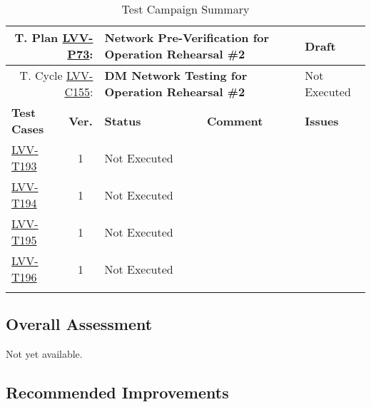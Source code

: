 \documentclass[DM,lsstdraft,STR,toc]{lsstdoc}
\begin{document}
{\small
\begin{longtable}{p{2cm}cp{2.3cm}p{8.6cm}p{2.3cm}}
\toprule
\multicolumn{2}{r}{ T. Plan \href{https://jira.lsstcorp.org/secure/Tests.jspa\#/testPlan/LVV-P73}{LVV-P73}:} &
\multicolumn{2}{p{10.9cm}}{\textbf{ Network Pre-Verification for Operation Rehearsal \#2 }} & Draft \\\hline
\multicolumn{2}{r}{ T. Cycle \href{https://jira.lsstcorp.org/secure/Tests.jspa\#/testCycle/LVV-C155}{LVV-C155}:} &
\multicolumn{2}{p{10.9cm}}{\textbf{ DM Network Testing for Operation Rehearsal \#2 }} & Not Executed \\\hline
\textbf{Test Cases} &  \textbf{Ver.} & \textbf{Status} & \textbf{Comment} & \textbf{Issues} \\\toprule
\href{https://jira.lsstcorp.org/secure/Tests.jspa#/testCase/LVV-T193}{LVV-T193}
&  1
& Not Executed &
\begin{minipage}[]{9cm}
\smallskip

\medskip
\end{minipage}
&
\\\hline
\href{https://jira.lsstcorp.org/secure/Tests.jspa#/testCase/LVV-T194}{LVV-T194}
&  1
& Not Executed &
\begin{minipage}[]{9cm}
\smallskip

\medskip
\end{minipage}
&
\\\hline
\href{https://jira.lsstcorp.org/secure/Tests.jspa#/testCase/LVV-T195}{LVV-T195}
&  1
& Not Executed &
\begin{minipage}[]{9cm}
\smallskip

\medskip
\end{minipage}
&
\\\hline
\href{https://jira.lsstcorp.org/secure/Tests.jspa#/testCase/LVV-T196}{LVV-T196}
&  1
& Not Executed &
\begin{minipage}[]{9cm}
\smallskip

\medskip
\end{minipage}
&
\\\hline
\caption{Test Campaign Summary}
\label{table:summary}
\end{longtable}
}

\subsection{Overall Assessment}
\label{sect:overallassessment}

Not yet available.

\subsection{Recommended Improvements}
\label{sect:recommendations}
\end{document}

